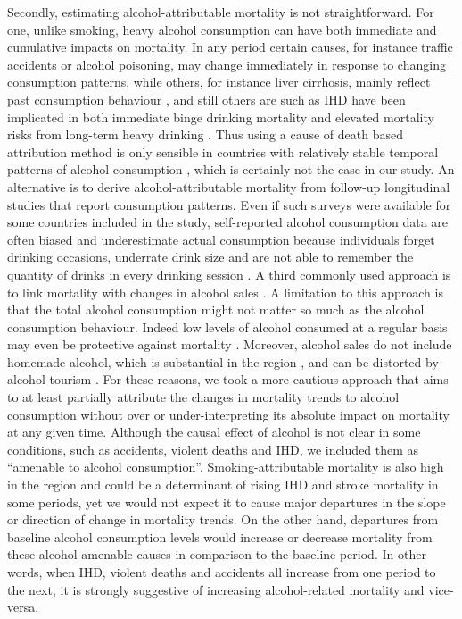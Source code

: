 \documentclass{article}
\begin{document}
\begin{spacing}{1.5}
Secondly, estimating alcohol-attributable mortality is not straightforward. For one, unlike smoking, heavy alcohol consumption can have both immediate and cumulative impacts on mortality. In any period certain causes, for instance traffic accidents or alcohol poisoning, may change immediately in response to changing consumption patterns, while others, for instance liver cirrhosis, mainly reflect past consumption behaviour \citep{ menon2001pathogenesis, rehm2003relationship}, and still others are such as IHD have been implicated in both immediate binge drinking mortality \citep{kauhanen1997beer} and elevated mortality risks from long-term heavy drinking \citep{roerecke2014alcohol}. Thus using a cause of death based attribution method is only sensible in countries with relatively stable temporal patterns of alcohol consumption \citep{kraus2015changes,martikainen2014income}, which is certainly not the case in our study. An alternative is to derive alcohol-attributable mortality from follow-up longitudinal studies that report consumption patterns. Even if such surveys were available for some countries included in the study, self-reported alcohol consumption data are often biased and underestimate actual consumption because individuals forget drinking occasions, underrate drink size and are not able to remember the quantity of drinks in every drinking session \citep{livingston2015underreporting,bellis2009off}. A third commonly used approach is to link mortality with changes in alcohol sales \citep{ evgeny2010beverage}. A limitation to this approach is that the total alcohol consumption might not matter so much as the alcohol consumption behaviour. Indeed low levels of alcohol consumed at a regular basis may even be protective against mortality \citep{bell2017,rehm2010relation, klatsky1974alcohol, roerecke2014alcohol}. Moreover, alcohol sales do not include homemade alcohol, which is substantial in the region \citep{popova2007comparing,mckee2005composition}, and can be distorted by alcohol tourism \citep{makela2009weakening,rabinovich2009affordability}. 
For these reasons, we took a more cautious approach that aims to at least partially attribute the changes in mortality trends to alcohol consumption without over or under-interpreting its absolute impact on mortality at any given time. Although the causal effect of alcohol is not clear in some conditions, such as accidents, violent deaths and IHD, we included them as ``amenable to alcohol consumption''. Smoking-attributable mortality is also high in the region \citep{ezzati2003estimates} and could be a determinant of rising IHD and stroke mortality in some periods, yet we would not expect it to cause major departures in the slope or direction of change in mortality trends.  On the other hand, departures from baseline alcohol consumption levels would increase or decrease mortality from these alcohol-amenable causes in comparison to the baseline period. In other words, when IHD, violent deaths and accidents all increase from one period to the next, it is strongly suggestive of increasing alcohol-related mortality and vice-versa. 



\end{spacing}
\end{document}
